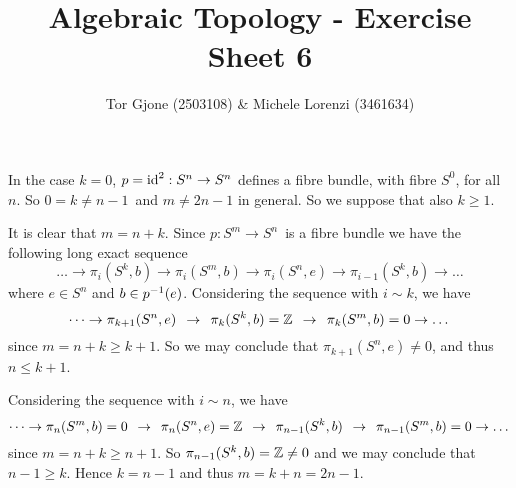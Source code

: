 \documentclass[a4paper,11pt,english]{article}
\title{\textbf{Algebraic Topology} - Exercise Sheet 6}
\author{Tor Gjone (2503108) \& Michele Lorenzi (3461634)}
\begin{document}
\mmaketitle


\begin{exercise}[1]

In the case $k = 0$, $p = \operatorname{id}^2: S^n \to S^n$ defines a fibre bundle, with fibre
$S^0$, for all $n$. So $0 = k \ne n-1$ and $m \ne 2n -1$ in general. 
So we suppose that also $k \ge 1$.


It is clear that $m = n+k$. Since $p: S^m \to S^n$ is a fibre bundle we have the
following long exact sequence
\[ \dots \to \pi_i(S^k,b) \to \pi_i(S^m,b) \to \pi_i(S^n,e) \to \pi_{i-1}(S^k, b) \to
\dots \]
where $e \in S^n$ and $b \in p^{-1}(e)$. 
Considering the sequence with $i \sim k$, we have
\[ \dots \to \pi_{k+1}(S^n,e) \:\:\to\:\: \pi_{k}(S^k, b) = \mathbb{Z} \:\:\to\:\: \pi_k(S^m,b) = 0 \to \dots \]
since $m = n+k \ge k+1$. So we may conclude that $\pi_{k+1}(S^n,e)\ne 0$, and
thus $n \le k+1$.

Considering the sequence with $i \sim n$, we have
\[ \dots \to \pi_n(S^m,b) = 0 \:\:\to\:\: \pi_n(S^n,e) = \mathbb{Z} \:\:\to\:\: \pi_{n-1}(S^k,b)
\:\:\to\:\: \pi_{n-1}(S^m,b) = 0 \to \dots \]
since $m = n+k \ge n+1$. So $\pi_{n-1}(S^k,b) = \mathbb{Z} \ne 0$ and we may conclude
that $n-1 \ge k$. Hence $k = n-1$ and thus $m = k+n = 2n-1$.

\end{exercise}
\end{document}
